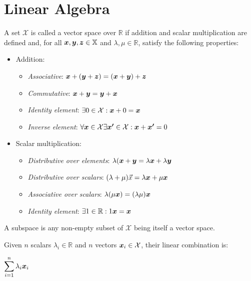 \chapter{Linear Algebra}

\begin{definition}
A set $\mathcal{X}$ is called a vector space over $\mathbb{R}$ if addition and scalar multiplication are defined and, for all $\bm{x},\bm{y},\bm{z}\in\mathbb{X}$ and $\lambda,\mu\in\mathbb{R}$, satisfy the following properties:
\begin{itemize}
	\item Addition:
		\begin{itemize}
			\item \textit{Associative}: $\bm{x}+(\bm{y}+\bm{z})=(\bm{x}+\bm{y})+\bm{z}$
			\item \textit{Commutative}: $\bm{x}+\bm{y}=\bm{y}+\bm{x}$
			\item \textit{Identity element}: $\exists 0\in\mathcal{X}:\bm{x}+0=\bm{x}$
			\item \textit{Inverse element}: $\forall\bm{x}\in\mathcal{X}\exists\bm{x'}\in\mathcal{X}:\bm{x}+\bm{x'}=0$
		\end{itemize}
	\item Scalar multiplication:
		\begin{itemize}	
			\item \textit{Distributive over elements}: $\lambda(\bm{x}+\bm{y}=\lambda\bm{x}+\lambda\bm{y}$
			\item \textit{Distributive over scalars}: $(\lambda+\mu)\vec{x}=\lambda\bm{x}+\mu\bm{{x}}$
			\item \textit{Associative over scalars}: $\lambda(\mu\bm{x})=(\lambda\mu)\bm{x}$
			\item \textit{Identity element}: $\exists 1\in\mathbb{R}:1\bm{x}=\bm{x}$
		\end{itemize}
\end{itemize}
\end{definition}
\begin{definition}[Subspace]
A subspace is any non-empty subset of $\mathcal{X}$ being itself a vector space.
\end{definition}
\begin{definition}
Given $n$ scalars $\lambda_i\in\mathbb{R}$ and $n$ vectors $\bm{x}_i\in\mathcal{X}$, their linear combination is: 
\begin{center}
	$\displaystyle \displaystyle\sum_{i=1}^n\lambda_i\bm{x}_i$
\end{center}
\end{definition}
